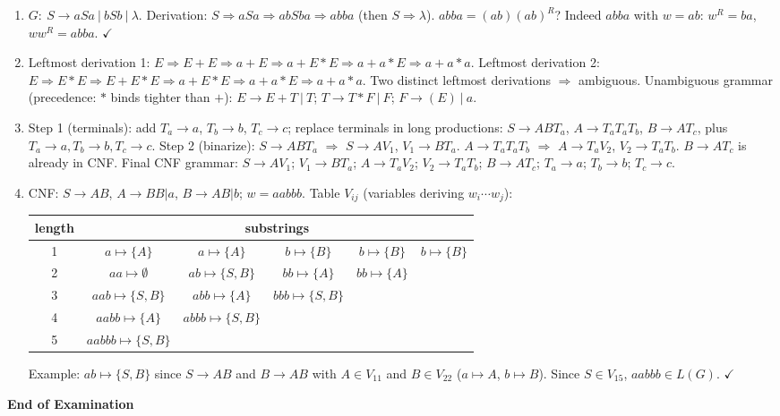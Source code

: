 \documentclass[11pt,a4paper]{article}
\newcounter{prob}
\newenvironment{solution}{%
  \begin{tcolorbox}[enhanced,breakable,colback=Honeydew!55,colframe=ForestGreen!60!black,
      boxrule=0.6pt,arc=1.5mm,left=5pt,right=5pt,top=3pt,bottom=3pt,
      before skip=6pt,after skip=10pt,
      title={\textbf{Solution \theprob}},fonttitle=\bfseries, coltitle=white,
      colbacktitle=ForestGreen!60!black, boxed title style={arc=1mm}]}
{\end{tcolorbox}}
\newcommand{\ok}{\ensuremath{\checkmark}}
\begin{document}
\begin{solution}
\begin{enumerate}[label=(\alph*)]
  \item $G:\ S\to aSa\ |\ bSb\ |\ \lambda$. Derivation:
  $S\Rightarrow aSa\Rightarrow abSba\Rightarrow abba$ (then
  $S\Rightarrow\lambda$). $abba=(ab)(ab)^R$? Indeed $abba$ with
  $w=ab$: $w^R=ba$, $ww^R=abba$. \ok
  \item Leftmost derivation 1:
  $E\Rightarrow E+E\Rightarrow a+E\Rightarrow a+E*E\Rightarrow a+a*E\Rightarrow a+a*a$.
  Leftmost derivation 2:
  $E\Rightarrow E*E\Rightarrow E+E*E\Rightarrow a+E*E\Rightarrow a+a*E\Rightarrow a+a*a$.
  Two distinct leftmost derivations $\Rightarrow$ ambiguous.
  Unambiguous grammar (precedence: $*$ binds tighter than $+$):
  $E\to E+T\ |\ T$; $T\to T*F\ |\ F$; $F\to (E)\ |\ a$.
  \item Step 1 (terminals): add $T_a\to a$, $T_b\to b$, $T_c\to c$;
  replace terminals in long productions:
  $S\to ABT_a$, $A\to T_aT_aT_b$, $B\to AT_c$, plus $T_a\to a,T_b\to b,T_c\to c$.
  Step 2 (binarize):
  $S\to ABT_a$ $\Rightarrow$ $S\to AV_1$, $V_1\to BT_a$.
  $A\to T_aT_aT_b$ $\Rightarrow$ $A\to T_aV_2$, $V_2\to T_aT_b$.
  $B\to AT_c$ is already in CNF.
  Final CNF grammar:
  $S\to AV_1$; $V_1\to BT_a$; $A\to T_aV_2$; $V_2\to T_aT_b$;
  $B\to AT_c$; $T_a\to a$; $T_b\to b$; $T_c\to c$.
  \item CNF: $S\to AB$, $A\to BB|a$, $B\to AB|b$; $w=aabbb$.
  Table $V_{ij}$ (variables deriving $w_i\cdots w_j$):
  \begin{center}
  \begin{tabular}{c|ccccc}
  length & \multicolumn{5}{c}{substrings}\\ \hline
  1 & $a\mapsto\{A\}$ & $a\mapsto\{A\}$ & $b\mapsto\{B\}$ & $b\mapsto\{B\}$ & $b\mapsto\{B\}$\\
  2 & $aa\mapsto\emptyset$ & $ab\mapsto\{S,B\}$ & $bb\mapsto\{A\}$ & $bb\mapsto\{A\}$ & \\
  3 & $aab\mapsto\{S,B\}$ & $abb\mapsto\{A\}$ & $bbb\mapsto\{S,B\}$ & & \\
  4 & $aabb\mapsto\{A\}$ & $abbb\mapsto\{S,B\}$ & & & \\
  5 & $aabbb\mapsto\{S,B\}$ & & & & \\
  \end{tabular}
  \end{center}
  Example: $ab\mapsto\{S,B\}$ since $S\to AB$ and $B\to AB$ with
  $A\in V_{11}$ and $B\in V_{22}$ ($a\mapsto A$, $b\mapsto B$).
  Since $S\in V_{15}$, $aabbb\in L(G)$. \ok
\end{enumerate}
\end{solution}

\vspace{3mm}
{\color{SteelBlue}\bfseries\large End of Examination}
\end{document}
